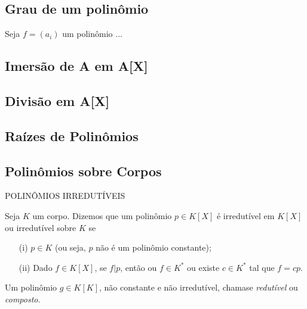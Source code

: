 \subsection{Grau de um polinômio}

\begin{defi}
Seja $f=(a_i)$ um polinômio ...
\end{defi}



\subsection{Imersão de A em A[X]}



\subsection{Divisão em A[X]}



\subsection{Raízes de Polinômios}



\subsection{Polinômios sobre Corpos}

POLINÔMIOS IRREDUTÍVEIS

\begin{defi}
Seja $K$ um corpo. Dizemos que um polinômio $p\in K[X]$ é irredutível em $K[X]$ ou irredutível sobre $K$ se

\begin{enumerate}
    \item[(i)]  $p\in K$ (ou seja, $p$ não é um polinômio constante);
    \item[(ii)] Dado $f \in K[X]$, se $f|p$, então ou $f \in K^*$ ou existe $c \in K^*$ tal que $f=cp$.
\end{enumerate}
\end{defi}

Um polinômio $g \in K[K]$, não constante e não irredutível, chamase \textit{redutível} ou \textit{composto}.
